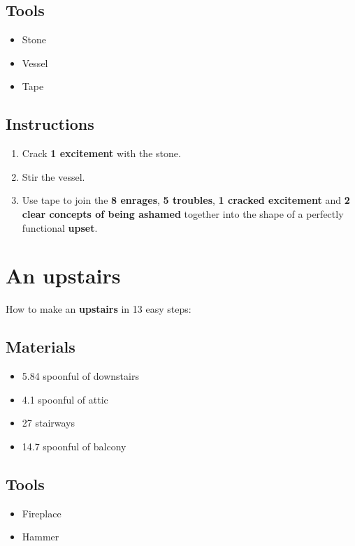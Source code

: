 \documentclass{article}
\begin{document}
\subsection{Tools}\begin{itemize}
\item 
Stone
\item 
Vessel
\item 
Tape
\end{itemize}
\subsection{Instructions}\begin{enumerate}
\item 
Crack \textbf{1 excitement} with the stone.
\item 
Stir the vessel.
\item 
Use tape to join the \textbf{8 enrages}, \textbf{5 troubles}, \textbf{1 cracked excitement} and \textbf{2 clear concepts of being ashamed} together into the shape of a perfectly functional \textbf{upset}.
\end{enumerate}
\newpage
\section{An upstairs}How to make an \textbf{upstairs} in 13 easy steps:

\subsection{Materials}\begin{itemize}
\item 
5.84 spoonful of downstairs
\item 
4.1 spoonful of attic
\item 
27 stairways
\item 
14.7 spoonful of balcony
\end{itemize}
\subsection{Tools}\begin{itemize}
\item 
Fireplace
\item 
Hammer
\end{itemize}
\end{document}
